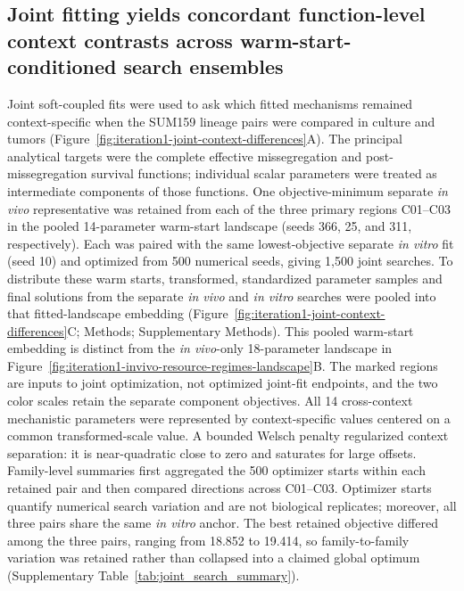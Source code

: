 \documentclass[11pt]{article}
\begin{document}
\subsection*{Joint fitting yields concordant function-level context contrasts across warm-start-conditioned search ensembles}

Joint soft-coupled fits were used to ask which fitted mechanisms remained context-specific when the SUM159 lineage pairs were compared in culture and tumors (Figure~\ref{fig:iteration1-joint-context-differences}A). The principal analytical targets were the complete effective missegregation and post-missegregation survival functions; individual scalar parameters were treated as intermediate components of those functions. One objective-minimum separate \textit{in vivo} representative was retained from each of the three primary regions C01--C03 in the pooled 14-parameter warm-start landscape (seeds 366, 25, and 311, respectively). Each was paired with the same lowest-objective separate \textit{in vitro} fit (seed 10) and optimized from 500 numerical seeds, giving 1,500 joint searches. To distribute these warm starts, transformed, standardized parameter samples and final solutions from the separate \textit{in vivo} and \textit{in vitro} searches were pooled into that fitted-landscape embedding (Figure~\ref{fig:iteration1-joint-context-differences}C; Methods; Supplementary Methods). This pooled warm-start embedding is distinct from the \textit{in vivo}-only 18-parameter landscape in Figure~\ref{fig:iteration1-invivo-resource-regimes-landscape}B. The marked regions are inputs to joint optimization, not optimized joint-fit endpoints, and the two color scales retain the separate component objectives. All 14 cross-context mechanistic parameters were represented by context-specific values centered on a common transformed-scale value. A bounded Welsch penalty regularized context separation: it is near-quadratic close to zero and saturates for large offsets. Family-level summaries first aggregated the 500 optimizer starts within each retained pair and then compared directions across C01--C03. Optimizer starts quantify numerical search variation and are not biological replicates; moreover, all three pairs share the same \textit{in vitro} anchor. The best retained objective differed among the three pairs, ranging from 18.852 to 19.414, so family-to-family variation was retained rather than collapsed into a claimed global optimum (Supplementary Table~\ref{tab:joint_search_summary}).
\end{document}
